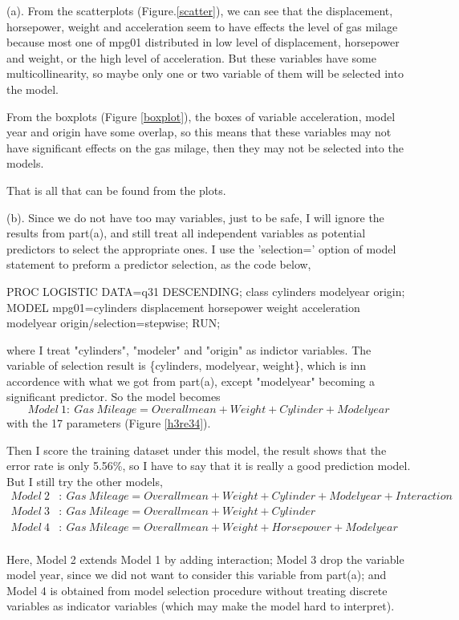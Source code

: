 \documentclass[letterpaper, 12pt]{article}
\newcommand{\ba}{$$\begin{aligned}}
\newcommand{\ea}{\end{aligned}$$}
\begin{document}
(a). From the scatterplots (Figure.\ref{scatter}), we can see that the displacement, horsepower, weight and acceleration seem to have effects the level of gas milage because most one of mpg01 distributed in low level of displacement, horsepower and weight, or the high level of acceleration. But these variables have some multicollinearity, so maybe only one or two variable of them will be selected into the model.

From the boxplots (Figure \ref{boxplot}), the boxes of variable acceleration, model year and origin have some overlap, so this means that these variables may not have significant effects on the gas milage, then they may not be selected into the models.

That is all that can be found from the plots.

(b). Since we do not have too may variables, just to be safe, I will ignore the results from part(a), and still treat all independent variables as potential predictors to select the appropriate ones. I use the 'selection=' option of model statement to preform a predictor selection, as the code below,
\begin{Sascode}[store=class]
PROC LOGISTIC DATA=q31 DESCENDING;
class cylinders modelyear origin;
MODEL mpg01=cylinders displacement horsepower weight
 acceleration modelyear origin/selection=stepwise;
RUN;
\end{Sascode}
where I treat "cylinders", "modeler" and "origin" as indictor variables. The variable of selection result is \{cylinders, modelyear, weight\}, which is inn accordence with what we got from part(a), except "modelyear" becoming a significant predictor. So the model becomes 
$$
Model~1:~Gas~Mileage=Overallmean+Weight+Cylinder+Modelyear
$$
with the 17 parameters (Figure \ref{h3re34}).

Then I score the training dataset under this model, the result shows that the error rate is only 5.56\%, so I have to say that it is really a good prediction model. But I still try the other models,
\ba
Model~2&:~Gas~Mileage=Overallmean+Weight+Cylinder+Modelyear+Interaction\\
Model~3&:~Gas~Mileage=Overallmean+Weight+Cylinder\\
Model~4&:~Gas~Mileage=Overallmean+Weight+Horsepower+Modelyear\\
\ea

Here, Model 2 extends Model 1 by adding interaction; Model 3 drop the variable model year, since we did not want to consider this variable from part(a); and Model 4 is obtained from model selection procedure without treating discrete variables as indicator variables (which may make the model hard to interpret). 
\end{document}
